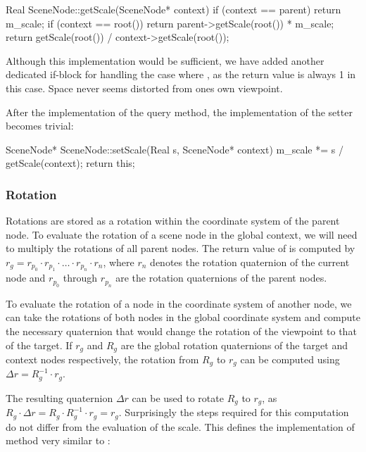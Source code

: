 			\begin{code}[4]
				Real SceneNode::getScale(SceneNode* context) {
				    if (context == parent) {
				        return m_scale;
				    }
				    if (context == root()) {
				        return parent->getScale(root()) * m_scale;
				    }
				    return getScale(root()) / context->getScale(root());
				}
			\end{code}

			Although this implementation would be sufficient, we have added another dedicated if-block for handling the case where , as the return value is always 1 in this case. Space never seems distorted from ones own viewpoint.
	
			After the implementation of the query method, the implementation of the setter becomes trivial:

			\begin{code}[4]
				SceneNode* SceneNode::setScale(Real s, SceneNode* context) {
				    m_scale *= s / getScale(context);
				    return this;
				}
			\end{code}

		\subsubsection{Rotation}

			Rotations are stored as a rotation within the coordinate system of the parent node. To evaluate the rotation of a scene node in the global context, we will need to multiply the rotations of all parent nodes. The return value of  is computed by $r_g = r_{p_0} \cdot r_{p_1} \cdot \ldots \cdot r_{p_n} \cdot r_n$, where $r_n$ denotes the rotation quaternion of the current node and $r_{p_0}$ through $r_{p_n}$ are the rotation quaternions of the parent nodes.

			To evaluate the rotation of a node in the coordinate system of another node, we can take the rotations of both nodes in the global coordinate system and compute the necessary quaternion that would change the rotation of the viewpoint to that of the target. If $r_g$ and $R_g$ are the global rotation quaternions of the target and context nodes respectively, the rotation from $R_g$ to $r_g$ can be computed using $\Delta r = R_g^{-1} \cdot r_g$.

			The resulting quaternion $\Delta r$ can be used to rotate $R_g$ to $r_g$, as $R_g \cdot \Delta r = R_g \cdot R_g^{-1} \cdot r_g = r_g$. Surprisingly the steps required for this computation do not differ from the evaluation of the scale. This defines the implementation of  method very similar to :

